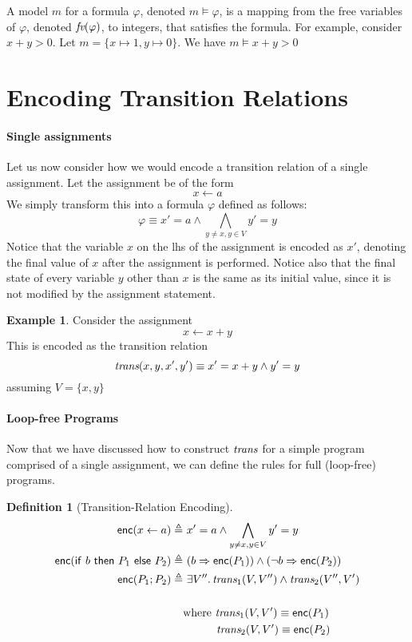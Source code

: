 \documentclass{amsart}
\theoremstyle{definition}
\newtheorem{definition}[theorem]{Definition}
\newtheorem{example}[theorem]{Example}
\theoremstyle{remark}
\numberwithin{equation}{section}
\begin{document}
A model $m$ for a formula $\varphi$, denoted $m \models \varphi$,
is a mapping from the free variables of $\varphi$,
denoted $\emph{fv}(\varphi)$, to integers, that satisfies the
formula.
For example, consider $x + y > 0$.
Let $m = \{x \mapsto 1, y \mapsto 0\}$.
We have  $m \models x + y > 0$

\section{Encoding Transition Relations}
\paragraph{Single assignments}
Let us now consider how we would encode a transition
relation of a single assignment.
Let the assignment be of the form
$$x \gets a$$
We simply transform this into a formula $\varphi$ defined
as follows:
$$\varphi \equiv x' = a \land \bigwedge_{y \neq x, y \in V} y' = y$$
Notice that the variable $x$ on the lhs of the assignment
is encoded as $x'$, denoting the final value of $x$ after
the assignment is performed.
Notice also that the final state of every variable $y$ other than $x$
is the same as its initial value, since it is not modified by the assignment statement.


\begin{example}
  Consider the assignment
  $$x \gets x + y$$
  This is encoded as the transition relation
  $$\emph{trans}(x,y,x',y') \equiv x' = x + y \land y' = y$$
  assuming $V = \{x,y\}$
\end{example}

\paragraph{Loop-free Programs}
Now that we have discussed how to construct $\emph{trans}$
for a simple program comprised of a single assignment,
we can define the rules for full (loop-free) programs.

\begin{definition}[Transition-Relation Encoding]
\begin{align*}
  \mathsf{enc}(x \gets a) \triangleq&~  x' = a \land \bigwedge_{y \neq x, y \in V} y' = y\\
  \mathsf{enc}(\mathsf{if}~ b ~ \mathsf{then}~ P_1 ~\mathsf{else}~ P_2) \triangleq&~
    (b \Rightarrow \mathsf{enc}(P_1)) \land (\neg b \Rightarrow \mathsf{enc}(P_2))\\
  \mathsf{enc}(P_1; P_2) \triangleq&~ \exists V'' \ldotp \emph{trans}_1(V,V'') \land \emph{trans}_2(V'',V')\\
  ~\\
  & \text{where } \emph{trans}_1(V,V') \equiv \mathsf{enc}(P_1)\\
        & \hspace{3em} \emph{trans}_2(V,V') \equiv \mathsf{enc}(P_2)
\end{align*}
\end{definition}
\end{document}

